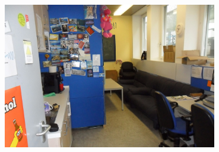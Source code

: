 \enlargethispage{\baselineskip}
\begin{center}
\vspace{-0.4cm}
\includegraphics[width=0.7\textwidth]{res/fsphys_foto_fs_raum_cropped.jpg}
\end{center}


